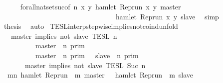 \begin{isabellebody}
\ \ \ \ \isamarkupfalse%
\ forall{\isacharunderscore}nat{\isacharunderscore}set{\isacharunderscore}suc{\isacharbrackleft}of\ {\isacartoucheopen}n{\isacartoucheclose}\ {\isacartoucheopen}{\isasymlambda}x\ y{\isachardot}\ hamlet\ {\isacharparenleft}{\isacharparenleft}Rep{\isacharunderscore}run\ x{\isacharparenright}\ y\ master{\isacharparenright}\isanewline
\ \ \ \ \ \ \ \ \ \ \ \ \ \ \ \ \ \ \ \ \ \ \ \ \ \ \ \ \ \ \ \ {\isasymlongrightarrow}\ hamlet\ {\isacharparenleft}{\isacharparenleft}Rep{\isacharunderscore}run\ x{\isacharparenright}\ y\ slave{\isacharparenright}{\isacartoucheclose}{\isacharbrackright}\ \isamarkupfalse%
\ simp\isanewline
\ \ \isamarkupfalse%
\ {\isacharquery}thesis\ \isamarkupfalse%
\ auto\isanewline
{}\isamarkupfalse%
%
\endisatagproof
{\isafoldproof}%
%
\isadelimproof
\isanewline
%
\endisadelimproof
\isanewline
{}\isamarkupfalse%
\ TESL{\isacharunderscore}interp{\isacharunderscore}stepwise{\isacharunderscore}implies{\isacharunderscore}not{\isacharunderscore}coind{\isacharunderscore}unfold{\isacharcolon}\isanewline
\ \ {\isacartoucheopen}{\isasymlbrakk}\ master\ implies\ not\ slave\ {\isasymrbrakk}\isactrlsub T\isactrlsub E\isactrlsub S\isactrlsub L\isactrlbsup {\isasymge}\ n\isactrlesup \ {\isacharequal}\isanewline
\ \ \ \ \ {\isacharparenleft}\ \ \ \ {\isasymlbrakk}\ master\ {\isasymnot}{\isasymUp}\ n\ {\isasymrbrakk}\isactrlsub p\isactrlsub r\isactrlsub i\isactrlsub m\ \ \ \ \ \ \ \ \ \ \ \ \ \ \ \ \ \ \ \ \ \ \ %
\isanewline
\ \ \ \ \ \ \ \ {\isasymunion}\ {\isasymlbrakk}\ master\ {\isasymUp}\ n\ {\isasymrbrakk}\isactrlsub p\isactrlsub r\isactrlsub i\isactrlsub m\ {\isasyminter}\ {\isasymlbrakk}\ slave\ {\isasymnot}{\isasymUp}\ n\ {\isasymrbrakk}\isactrlsub p\isactrlsub r\isactrlsub i\isactrlsub m{\isacharparenright}\ \ %
\isanewline
\ \ \ \ \ {\isasyminter}\ {\isasymlbrakk}\ master\ implies\ not\ slave\ {\isasymrbrakk}\isactrlsub T\isactrlsub E\isactrlsub S\isactrlsub L\isactrlbsup {\isasymge}\ Suc\ n\isactrlesup {\isacartoucheclose}\isanewline
%
\isadelimproof
%
\endisadelimproof
%
\isatagproof
{}\isamarkupfalse%
\ {\isacharminus}\isanewline
\ \ \isamarkupfalse%
\ {\isacartoucheopen}{\isacharbraceleft}{\isasymrho}{\isachardot}\ {\isasymforall}m{\isasymge}n{\isachardot}\ hamlet\ {\isacharparenleft}{\isacharparenleft}Rep{\isacharunderscore}run\ {\isasymrho}{\isacharparenright}\ m\ master{\isacharparenright}\ {\isasymlongrightarrow}\ {\isasymnot}\ hamlet\ {\isacharparenleft}{\isacharparenleft}Rep{\isacharunderscore}run\ {\isasymrho}{\isacharparenright}\ m\ slave{\isacharparenright}{\isacharbraceright}\isanewline

\end{isabellebody}
